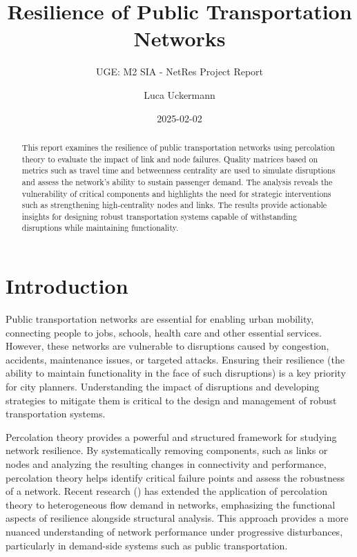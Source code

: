 \documentclass[
  letterpaper,
  DIV=11,
  numbers=noendperiod]{scrartcl}
\title{Resilience of Public Transportation Networks}
\subtitle{UGE: M2 SIA - NetRes Project Report}
\author{Luca Uckermann}
\date{2025-02-02}
\renewcommand*\contentsname{Table of contents}
\newcommand\contentsname{Table of contents}
\begin{document}
\maketitle
\begin{abstract}
This report examines the resilience of public transportation networks
using percolation theory to evaluate the impact of link and node
failures. Quality matrices based on metrics such as travel time and
betweenness centrality are used to simulate disruptions and assess the
network's ability to sustain passenger demand. The analysis reveals the
vulnerability of critical components and highlights the need for
strategic interventions such as strengthening high-centrality nodes and
links. The results provide actionable insights for designing robust
transportation systems capable of withstanding disruptions while
maintaining functionality.
\end{abstract}

\renewcommand*\contentsname{Table of contents}
{
\hypersetup{linkcolor=}
\setcounter{tocdepth}{2}
\tableofcontents
}

\section{Introduction}\label{introduction}

Public transportation networks are essential for enabling urban
mobility, connecting people to jobs, schools, health care and other
essential services. However, these networks are vulnerable to
disruptions caused by congestion, accidents, maintenance issues, or
targeted attacks. Ensuring their resilience (the ability to maintain
functionality in the face of such disruptions) is a key priority for
city planners. Understanding the impact of disruptions and developing
strategies to mitigate them is critical to the design and management of
robust transportation systems.

Percolation theory provides a powerful and structured framework for
studying network resilience. By systematically removing components, such
as links or nodes and analyzing the resulting changes in connectivity
and performance, percolation theory helps identify critical failure
points and assess the robustness of a network. Recent research
()
has extended the application of percolation theory to heterogeneous flow
demand in networks, emphasizing the functional aspects of resilience
alongside structural analysis. This approach provides a more nuanced
understanding of network performance under progressive disturbances,
particularly in demand-side systems such as public transportation.
\end{document}
